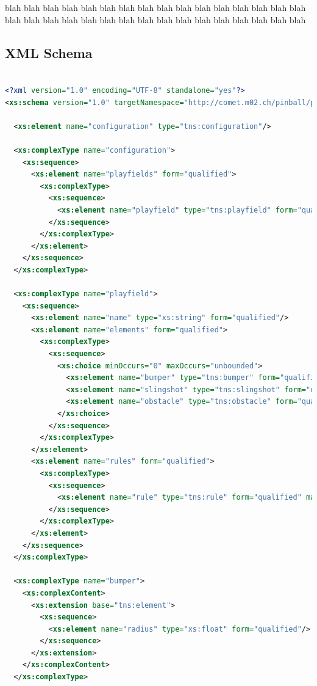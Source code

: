 \documentclass[fontsize=12pt,
               paper=a4,
               twoside=false,
               parskip=half,
               ]{scrartcl}
\begin{document}
blah blah blah blah blah blah blah blah blah blah blah blah blah blah blah blah 
blah blah blah blah blah blah blah blah blah blah blah blah blah blah blah blah

\subsection{XML Schema}


\begin{lstlisting}[language=xml,label=lst:default_playfield,caption={schema for playfields.xml}]

<?xml version="1.0" encoding="UTF-8" standalone="yes"?>
<xs:schema version="1.0" targetNamespace="http://comet.m02.ch/pinball/playfield" xmlns:tns="http://comet.m02.ch/pinball/playfield" xmlns:xs="http://www.w3.org/2001/XMLSchema">

  <xs:element name="configuration" type="tns:configuration"/>

  <xs:complexType name="configuration">
    <xs:sequence>
      <xs:element name="playfields" form="qualified">
        <xs:complexType>
          <xs:sequence>
            <xs:element name="playfield" type="tns:playfield" form="qualified" maxOccurs="unbounded"/>
          </xs:sequence>
        </xs:complexType>
      </xs:element>
    </xs:sequence>
  </xs:complexType>

  <xs:complexType name="playfield">
    <xs:sequence>
      <xs:element name="name" type="xs:string" form="qualified"/>
      <xs:element name="elements" form="qualified">
        <xs:complexType>
          <xs:sequence>
            <xs:choice minOccurs="0" maxOccurs="unbounded">
              <xs:element name="bumper" type="tns:bumper" form="qualified"/>
              <xs:element name="slingshot" type="tns:slingshot" form="qualified"/>
              <xs:element name="obstacle" type="tns:obstacle" form="qualified"/>
            </xs:choice>
          </xs:sequence>
        </xs:complexType>
      </xs:element>
      <xs:element name="rules" form="qualified">
        <xs:complexType>
          <xs:sequence>
            <xs:element name="rule" type="tns:rule" form="qualified" maxOccurs="unbounded"/>
          </xs:sequence>
        </xs:complexType>
      </xs:element>
    </xs:sequence>
  </xs:complexType>

  <xs:complexType name="bumper">
    <xs:complexContent>
      <xs:extension base="tns:element">
        <xs:sequence>
          <xs:element name="radius" type="xs:float" form="qualified"/>
        </xs:sequence>
      </xs:extension>
    </xs:complexContent>
  </xs:complexType>


\end{lstlisting}
\end{document}
